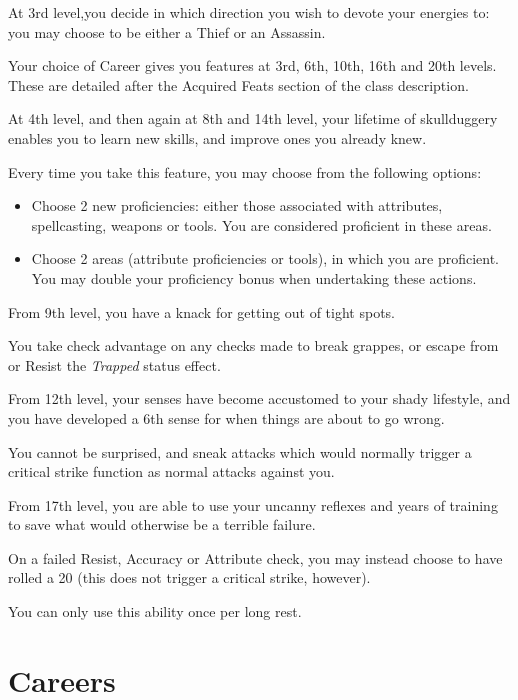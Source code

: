 At 3rd level,you decide in which direction you wish to devote your energies to: you may choose to be either a Thief or an Assassin. 

Your choice of Career gives you features at 3rd, 6th, 10th, 16th and 20th levels. These are detailed after the Acquired Feats section of the class description. 


At 4th level, and then again at 8th and 14th level, your lifetime of skullduggery enables you to learn new skills, and improve ones you already knew. 

Every time you take this feature, you may choose from the following options:
\begin{itemize}
	\item Choose 2 new proficiencies: either those associated with attributes, spellcasting, weapons or tools. You are considered proficient in these areas. 
	\item Choose 2 areas (attribute proficiencies or tools), in which you are proficient. You may double your proficiency bonus when undertaking these actions. 
\end{itemize}


From 9th level, you have a knack for getting out of tight spots. 

You take check advantage on any checks made to break grappes, or escape from or Resist the {\it Trapped} status effect. 


From 12th level, your senses have become accustomed to your shady lifestyle, and you have developed a 6th sense for when things are about to go wrong. 

You cannot be surprised, and sneak attacks which would normally trigger a critical strike function as normal attacks against you. 


From 17th level, you are able to use your uncanny reflexes and years of training to save what would otherwise be a terrible failure. 

On a failed Resist, Accuracy or Attribute check, you may instead choose to have rolled a 20 (this does not trigger a critical strike, however). 

You can only use this ability once per long rest. 

\section*{Careers}
